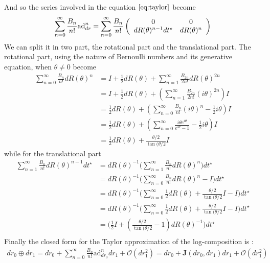 And so the series involved in the equation $\ref{eq:taylor}$ become
\begin{align*}
\sum_{n=0}^{\infty} \frac{B_{n}}{n!} \text{ad}_{dr}^{ n} 
=
\sum_{n=0}^{\infty} \frac{B_{n}}{n!} \left (
\begin{array} {c c}
0            &  0        \\
dR(\theta)^{n-1}dt^{\star}      &  dR(\theta)^{n}      
\end{array}
\right ) 
\end{align*}
We can split it in two part, the rotational part and the translational part. The rotational part, using the nature of Bernoulli numbers and its generative equation, when $\theta \neq 0$ become
\begin{align*}
\sum_{n=0}^{\infty} \frac{B_{n}}{n!} dR(\theta)^{n}  
&=
I + \frac{1}{2}dR(\theta) + \sum_{n=1}^{\infty}\frac{B_{2n}}{2n!} dR(\theta)^{2n}  \\
&=
I + \frac{1}{2}dR(\theta) + (\sum_{n=1}^{\infty}\frac{B_{2n}}{2n!} (i \theta)^{2n})I  \\
&=
\frac{1}{2}dR(\theta) + (\sum_{n=0}^{\infty}\frac{B_{n}}{n!}(i \theta)^{n} - \frac{1}{2} i\theta) I  \\
&=
\frac{1}{2}dR(\theta) + (\sum_{n=0}^{\infty} \frac{i\theta e^{i\theta}}{e^{i\theta} - 1} - \frac{1}{2} i\theta) I  \\
&=
\frac{1}{2}dR(\theta) +  \frac{\theta /2}{\tan(\theta/2} I  
\end{align*}
while for the translational part
\begin{align*}
\sum_{n=1}^{\infty} \frac{B_{n}}{n!} dR(\theta)^{n-1} dt^{\star} 
&=
dR(\theta)^{-1} \Big(\sum_{n=1}^{\infty}\frac{B_{n}}{n!} dR(\theta)^{n}\Big)dt^{\star} \\
&=
dR(\theta)^{-1}  \Big(\sum_{n=0}^{\infty}\frac{B_{n}}{n!} dR(\theta)^{n} - I \Big)dt^{\star}  \\
&=
dR(\theta)^{-1}  \Big(\sum_{n=0}^{\infty} \frac{1}{2}dR(\theta) +  \frac{\theta /2}{\tan(\theta/2} I  - I \Big) dt^{\star} \\ 
&=
dR(\theta)^{-1}  \Big(\sum_{n=0}^{\infty} \frac{1}{2}dR(\theta) +  \frac{\theta /2}{\tan(\theta/2} I  - I \Big)dt^{\star} \\
&=
\Big(\frac{1}{2} I + (\frac{\theta /2}{\tan(\theta/2} - 1)dR(\theta)^{-1}   \Big) dt^{\star}    \\
\end{align*}
Finally the closed form for the Taylor approximation of the log-composition is \cite{vercauteren2014preprint}:
\begin{align}\label{eq:taylor_se2}
dr_{0}\oplus dr_{1}
=
dr_{0}
+
\sum_{n=0}^{\infty} \frac{B_{n}}{n!} \text{ad}_{dr_{0}}^{ n} 
dr_{1}
+
\mathcal{O}(dr_{1}^2)
=
dr_{0}
+
\mathbf{J}(dr_{0}, dr_{1})
dr_{1}
+
\mathcal{O}(dr_{1}^2)
\end{align}
